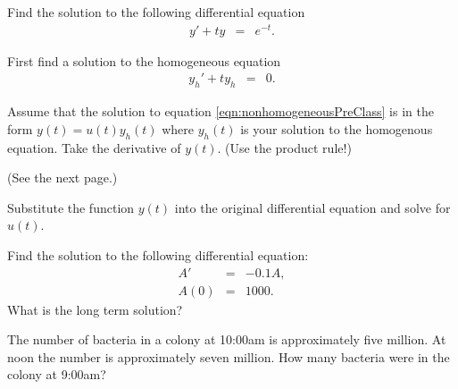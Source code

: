 


\begin{problem}
\item Find the solution to the following differential equation
  \begin{eqnarray}
    \label{eqn:nonhomogeneousPreClass}
    y' + ty & = & e^{-t}.
  \end{eqnarray}

  \begin{subproblem}
  \item First find a solution to the homogeneous equation
  \begin{eqnarray*}
    y_h' + ty_h & = & 0.
  \end{eqnarray*}
    \vfill

  \item Assume that the solution to equation
    \ref{eqn:nonhomogeneousPreClass} is in the form $y(t) = u(t)
    y_h(t)$ where $y_h(t)$ is your solution to the homogenous
    equation. Take the derivative of $y(t)$. (Use the product rule!)
    \vspace{8em}

    (See the next page.)
    \clearpage

  \item Substitute the function $y(t)$ into the original differential
    equation and solve for $u(t)$.
    \vfill

  \end{subproblem}
\end{problem}


  \begin{problem}
  \item Find the solution to the following differential equation:
    \begin{eqnarray*}
      A' & = & -0.1 A, \\
      A(0) & = & 1000.
    \end{eqnarray*}
    What is the long term solution?
    \vfill
    \clearpage
  \item The number of bacteria in a colony at 10:00am is approximately
    five million. At noon the number is approximately seven
    million. How many bacteria were in the colony at 9:00am?
    \vfill
  \end{problem}


